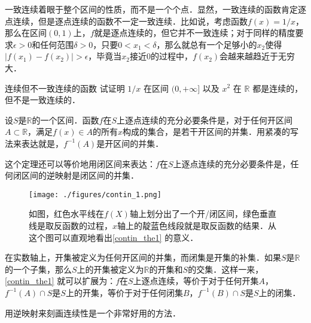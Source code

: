 一致连续着眼于整个区间的性质，而不是一个个点．显然，一致连续的函数肯定逐点连续，但是逐点连续的函数不一定一致连续．比如说，考虑函数$f(x)=1/x$，那么在区间$(0, 1)$上，$f$就是逐点连续的，但它并不一致连续；对于同样的精度要求$\epsilon>0$和任何范围$\delta>0$，只要$0<x_1<\delta$，那么就总有一个足够小的$x_2$使得$|f(x_1)-f(x_2)|>\epsilon$，毕竟当$x_2$接近$0$的过程中，$f(x_2)$会越来越趋近于无穷大．

\begin{exercise}{连续但不一致连续的函数}
试证明 $1/x$ 在区间 $(0, +\infty]$ 以及 $x^2$ 在 $\mathbb R$ 都是连续的， 但不是一致连续的．
\end{exercise}

\begin{theorem}{}\label{contin_the1}
设$S$是$\mathbb{R}$的一个区间．函数$f$在$S$上逐点连续的充分必要条件是，对于任何开区间$A\subset \mathbb{R}$，满足$f(x)\in A$的所有$x$构成的集合，是若干开区间的并集．用紧凑的写法来表达就是，$f^{-1}(A)$是开区间的并集．
\end{theorem}

这个定理还可以等价地用闭区间来表达：$f$在$S$上逐点连续的充分必要条件是，任何闭区间的逆映射是闭区间的并集．

\begin{figure}[ht]
\centering
\texttt{[image: ./figures/contin\_1.png]}
\caption{如图，红色水平线在$f(X)$轴上划分出了一个开/闭区间，绿色垂直线是取反函数的过程，$x$轴上的靛蓝色线段就是取反函数的结果．从这个图可以直观地看出\autoref{contin_the1} 的意义．} \label{contin_fig1}
\end{figure}

在实数轴上，开集被定义为任何开区间的并集，而闭集是开集的补集．如果$S$是$\mathbb{R}$的一个子集，那么$S$上的开集被定义为$\mathbb{R}$的开集和$S$的交集．这样一来，\autoref{contin_the1} 就可以扩展为：$f$在$S$上逐点连续，等价于对于任何开集$A$，$f^{-1}(A)\cap S$是$S$上的开集，等价于对于任何闭集$B$，$f^{-1}(B)\cap S$是$S$上的闭集．

用逆映射来刻画连续性是一个非常好用的方法．
